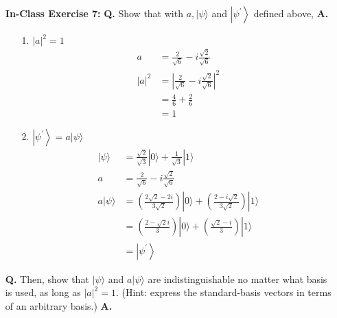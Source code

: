 \documentclass[main.tex]{subfiles}
\begin{document}
\begin{enumerate}
\item[] \textbf{In-Class Exercise 7:} \textbf{Q.} Show that with $a,|\psi\rangle$ and $\left|\psi^{\prime}\right\rangle$ defined above, \textbf{A.}

    \begin{enumerate}
        \item[1.] $|a|^{2}=1$
        \begin{align*}
            a       & = \frac{2}{\sqrt{6}}-i \frac{\sqrt{2}}{\sqrt{6}}\\
            |a|^2   & = |\frac{2}{\sqrt{6}}-i \frac{\sqrt{2}}{\sqrt{6}}|^2\\
                    & = \frac{4}{6} + \frac{2}{6}\\
                    & = 1
        \end{align*}
        \item[2.] $\left|\psi^{\prime}\right\rangle=a|\psi\rangle$
        \begin{align*}
            |\psi\rangle                        & = \frac{\sqrt{2}}{\sqrt{3}}|0\rangle+\frac{1}{\sqrt{3}}|1\rangle\\
            a                                   & = \frac{2}{\sqrt{6}}-i \frac{\sqrt{2}}{\sqrt{6}}\\
            a |\psi\rangle                      & = \left(\frac{2\sqrt{2}-2i}{3\sqrt{2}}\right)|0\rangle
                                                +\left(\frac{2-i\sqrt{2}}{3\sqrt{2}}\right)|1\rangle\\
                                                & = \left(\frac{2-\sqrt{2}i}{3}\right)|0\rangle
                                                +\left(\frac{\sqrt{2}-i}{3}\right)|1\rangle\\
                                                & = \left|\psi^{\prime}\right\rangle
        \end{align*}
        \end{enumerate}
        
\textbf{Q.} Then, show that $|\psi\rangle$ and $a|\psi\rangle$ are indistinguishable no matter what basis is used, as long as $|a|^{2}=1$. (Hint: express the standard-basis vectors in terms of an arbitrary basis.) \textbf{A.}


\end{enumerate}
\end{document}
